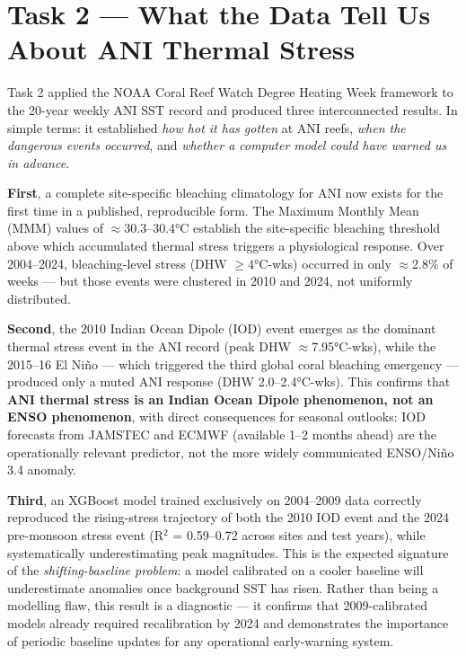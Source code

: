 \documentclass[12pt,a4paper]{report}
\begin{document}
\section{Task 2 \texorpdfstring{\textmd{---}}{---} What the Data Tell Us About ANI Thermal Stress}

Task 2 applied the NOAA Coral Reef Watch Degree Heating Week framework to the
20-year weekly ANI SST record and produced three interconnected results. In simple terms:
it established \textit{how hot it has gotten} at ANI reefs, \textit{when the dangerous events
occurred}, and \textit{whether a computer model could have warned us in advance}.

\textbf{First}, a complete site-specific bleaching climatology for ANI now exists for the
first time in a published, reproducible form. The Maximum Monthly Mean (MMM) values of
$\approx$30.3--30.4°C establish the site-specific bleaching threshold above which
accumulated thermal stress triggers a physiological response.
Over 2004--2024, bleaching-level stress (DHW $\geq 4$°C-wks) occurred in only
$\approx$2.8\% of weeks — but those events were clustered in 2010 and 2024, not
uniformly distributed.

\textbf{Second}, the 2010 Indian Ocean Dipole (IOD) event emerges as the dominant thermal
stress event in the ANI record (peak DHW $\approx$7.95°C-wks), while the 2015--16
El Niño — which triggered the third global coral bleaching emergency — produced
only a muted ANI response (DHW 2.0--2.4°C-wks).
This confirms that \textbf{ANI thermal stress is an Indian Ocean Dipole phenomenon,
not an ENSO phenomenon}, with direct consequences for seasonal outlooks: IOD forecasts
from JAMSTEC and ECMWF (available 1--2 months ahead) are the operationally relevant
predictor, not the more widely communicated ENSO/Niño 3.4 anomaly.

\textbf{Third}, an XGBoost model trained exclusively on 2004--2009 data correctly
reproduced the rising-stress trajectory of both the 2010 IOD event and the 2024
pre-monsoon stress event (R$^2$ = 0.59--0.72 across sites and test years), while
systematically underestimating peak magnitudes. This is the expected signature of the
\textit{shifting-baseline problem}: a model calibrated on a cooler baseline will
underestimate anomalies once background SST has risen.
Rather than being a modelling flaw, this result is a diagnostic — it confirms that
2009-calibrated models already required recalibration by 2024 and demonstrates the
importance of periodic baseline updates for any operational early-warning system.
\end{document}
